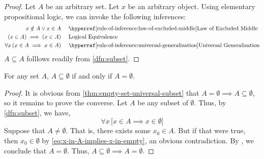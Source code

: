 \begin{proof}
    Let \( A \) be an arbitrary set. Let \( x \) be an arbitrary object.
    Using elementary propositional logic, we can invoke the following inferences:
    \begin{equation*}
        \begin{aligned}
            x \notin A \lor x \in A& \\
            \mleft( x \in A \mright) \implies \mleft( x \in A \mright)& \\
            \forall x \, \mleft( x \in A \implies x \in A \mright)&
        \end{aligned}
        \text{  }
        \begin{aligned}
            &\quad\text{\aref{rule-of-inference:law-of-excluded-middle}{Law of Excluded Middle}}\\
            &\quad\text{Logical Equivalence}\\
            &\quad\text{\aref{rule-of-inference:universal-generalization}{Universal Generalization}}
        \end{aligned}
    \end{equation*}
    \( A \subseteq A \) folllows readily from \cref{dfn:subset}.
\end{proof}

\begin{thm}
    \label{thm:only-the-empty-set-can-be-a-subset-of-the-empty-set}
    For any set \( A \), \( A \subseteq \emptyset \) if and only if \( A = \emptyset \).
\end{thm}

\begin{proof}
    It is obvious from \cref{thm:empty-set-universal-subset} that \( A = \emptyset \implies A \subseteq \emptyset \),
    so it remains to prove the converse. Let \( A \) be any subset of \( \emptyset \). Thus, by \cref{dfn:subset}, we
    have,
    \begin{equation}
        \label{eq:x-in-A-implies-x-in-empty}
        \forall x \, \big[ x \in A \implies x \in \emptyset \big]
    \end{equation}
    Suppose that \( A \neq \emptyset \). That is, there exists some \( x_{0} \in A \).
    But if that were true, then \( x_{0} \in \emptyset \) by \eqref{eq:x-in-A-implies-x-in-empty},
    an obvious contradiction. By , we conclude that \( A = \emptyset \).
    Thus, \( A \subseteq \emptyset \implies A = \emptyset \).
\end{proof}

